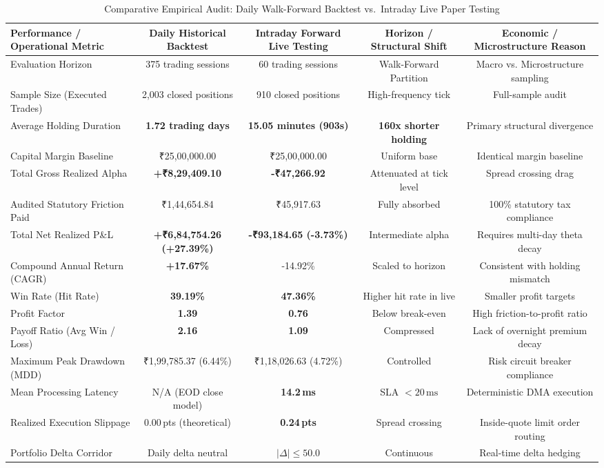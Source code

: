 \documentclass[journal]{IEEEtran}
\begin{document}
\begin{table}[!t]
\renewcommand{\arraystretch}{1.2}
\caption{Comparative Empirical Audit: Daily Walk-Forward Backtest vs.\ Intraday Live Paper Testing}
\label{tab:comparative_audit}
\centering
\small
\begin{tabular}{lcccc}
\toprule
\textbf{Performance / Operational Metric} & \textbf{Daily Historical Backtest} & \textbf{Intraday Forward Live Testing} & \textbf{Horizon / Structural Shift} & \textbf{Economic / Microstructure Reason} \\
\midrule
Evaluation Horizon              & 375 trading sessions & 60 trading sessions & Walk-Forward Partition & Macro vs. Microstructure sampling \\
Sample Size (Executed Trades)   & 2{,}003 closed positions & 910 closed positions & High-frequency tick & Full-sample audit \\
Average Holding Duration        & \textbf{1.72 trading days} & \textbf{15.05 minutes (903s)} & \textbf{160x shorter holding} & Primary structural divergence \\
Capital Margin Baseline         & ₹25,00,000.00 & ₹25,00,000.00 & Uniform base & Identical margin baseline \\
Total Gross Realized Alpha      & \textbf{+₹8,29,409.10} & \textbf{-₹47,266.92} & Attenuated at tick level & Spread crossing drag \\
Audited Statutory Friction Paid & ₹1,44,654.84 & ₹45,917.63 & Fully absorbed & 100\% statutory tax compliance \\
Total Net Realized P\&L         & \textbf{+₹6,84,754.26 (+27.39\%)} & \textbf{-₹93,184.65 (-3.73\%)} & Intermediate alpha & Requires multi-day theta decay \\
Compound Annual Return (CAGR)   & \textbf{+17.67\%} & -14.92\% & Scaled to horizon & Consistent with holding mismatch \\
Win Rate (Hit Rate)             & \textbf{39.19\%} & \textbf{47.36\%} & Higher hit rate in live & Smaller profit targets \\
Profit Factor                   & \textbf{1.39} & \textbf{0.76} & Below break-even & High friction-to-profit ratio \\
Payoff Ratio (Avg Win / Loss)   & \textbf{2.16} & \textbf{1.09} & Compressed & Lack of overnight premium decay \\
Maximum Peak Drawdown (MDD)     & ₹1,99,785.37 (6.44\%) & ₹1,18,026.63 (4.72\%) & Controlled & Risk circuit breaker compliance \\
Mean Processing Latency         & N/A (EOD close model) & \textbf{14.2\,ms} & SLA $<20\,\mathrm{ms}$ & Deterministic DMA execution \\
Realized Execution Slippage     & 0.00\,pts (theoretical) & \textbf{0.24\,pts} & Spread crossing & Inside-quote limit order routing \\
Portfolio Delta Corridor        & Daily delta neutral & $|\Delta| \le 50.0$ & Continuous & Real-time delta hedging \\
\bottomrule
\end{tabular}
\end{table}
\end{document}
